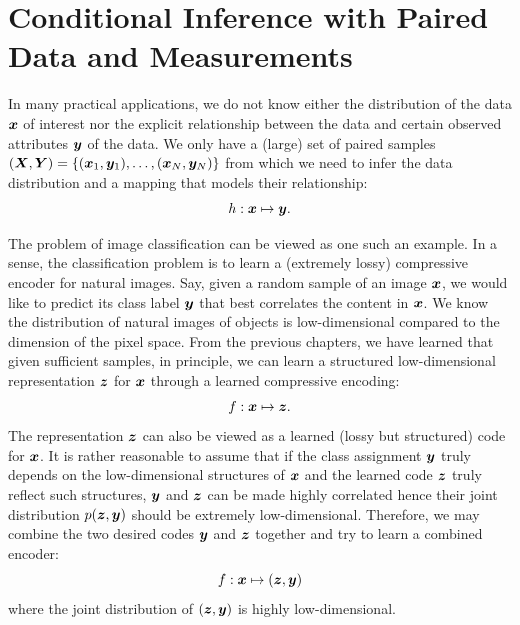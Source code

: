 \documentclass[../../book-main.tex]{subfiles}
\begin{document}
\section{Conditional Inference with Paired Data and Measurements}
In many practical applications, we do not know either the distribution of the data $\bm{x}$ of interest nor the explicit relationship between the data and certain observed attributes $\bm{y}$ of the data. We only have  a (large) set of paired samples $(\bm{X}, \bm{Y}) = \{ (\bm{x}_1, \bm{y}_1), \ldots, (\bm{x}_N, \bm{y}_N) \}$ from which we need to infer the data distribution and a mapping that models their relationship:
\begin{equation}
  h: \bm{x} \mapsto \bm{y}.
\end{equation}

The problem of image classification can be viewed as one such an example. In a sense, the classification problem is to learn a (extremely lossy) compressive encoder for natural images. Say, given a random sample of an image $\bm{x}$, we would like to predict its class label $\bm{y}$ that best correlates the content in $\bm{x}$. We know the distribution of natural images of objects is low-dimensional compared to the dimension of the pixel space. From the previous chapters, we have learned that given sufficient samples, in principle, we can learn a structured low-dimensional representation $\bm{z}$ for $\bm{x}$ through a learned compressive encoding:
\begin{equation}
    f: \bm{x} \mapsto \bm{z}. 
\end{equation}
The representation $\bm{z}$ can also be viewed as a learned (lossy but structured) code for $\bm{x}$. It is rather reasonable to assume that if the class assignment $\bm{y}$  truly depends on the low-dimensional  structures of $\bm{x}$ and the learned code $\bm{z}$ truly reflect such structures, $\bm{y}$ and $\bm{z}$ can be made highly correlated hence their joint distribution $p(\bm{z}, \bm{y})$ should be extremely low-dimensional. Therefore, we may combine the two desired codes $\bm{y}$ and $\bm{z}$ together and try to learn a combined encoder:
\begin{equation}
    f: \bm{x} \mapsto (\bm{z}, \bm{y}) 
\end{equation}
where the joint distribution of $(\bm{z}, \bm{y})$ is highly low-dimensional. 
\end{document}
